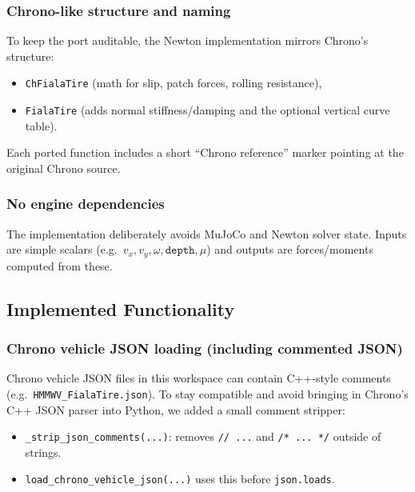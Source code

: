 \subsubsection{Chrono-like structure and naming}
To keep the port auditable, the Newton implementation mirrors Chrono's structure:
\begin{itemize}
  \item \texttt{ChFialaTire} (math for slip, patch forces, rolling resistance),
  \item \texttt{FialaTire} (adds normal stiffness/damping and the optional vertical curve table).
\end{itemize}
Each ported function includes a short ``Chrono reference'' marker pointing at the original Chrono source.

\subsubsection{No engine dependencies}
The implementation deliberately avoids MuJoCo and Newton solver state.
Inputs are simple scalars (e.g.\ $v_x, v_y, \omega, \texttt{depth}, \mu$) and outputs are forces/moments computed from these.

\subsection{Implemented Functionality}
\subsubsection{Chrono vehicle JSON loading (including commented JSON)}
Chrono vehicle JSON files in this workspace can contain C++-style comments (e.g.\ \texttt{HMMWV\_FialaTire.json}).
To stay compatible and avoid bringing in Chrono's C++ JSON parser into Python, we added a small comment stripper:
\begin{itemize}
  \item \texttt{\_strip\_json\_comments(...)}: removes \texttt{// ...} and \texttt{/* ... */} outside of strings.
  \item \texttt{load\_chrono\_vehicle\_json(...)} uses this before \texttt{json.loads}.
\end{itemize}

